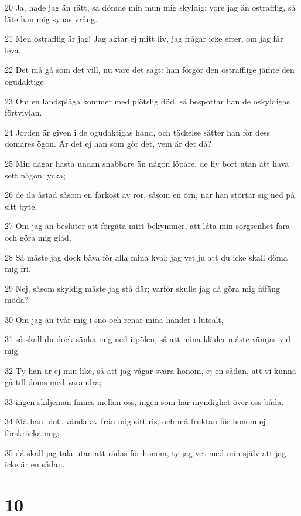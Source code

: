 \par 20 Ja, hade jag än rätt, så dömde min mun mig skyldig; vore jag än ostrafflig, så läte han mig synas vrång.
\par 21 Men ostrafflig är jag! Jag aktar ej mitt liv, jag frågar icke efter, om jag får leva.
\par 22 Det må gå som det vill, nu vare det sagt: han förgör den ostrafflige jämte den ogudaktige.
\par 23 Om en landsplåga kommer med plötslig död, så bespottar han de oskyldigas förtvivlan.
\par 24 Jorden är given i de ogudaktigas hand, och täckelse sätter han för dess domares ögon. Är det ej han som gör det, vem är det då?
\par 25 Min dagar hasta undan snabbare än någon löpare, de fly bort utan att hava sett någon lycka;
\par 26 de ila åstad såsom en farkost av rör, såsom en örn, när han störtar sig ned på sitt byte.
\par 27 Om jag än besluter att förgäta mitt bekymmer, att låta min sorgsenhet fara och göra mig glad,
\par 28 Så måste jag dock bäva för alla mina kval; jag vet ju att du icke skall döma mig fri.
\par 29 Nej, såsom skyldig måste jag stå där; varför skulle jag då göra mig fåfäng möda?
\par 30 Om jag än tvår mig i snö och renar mina händer i lutsalt,
\par 31 så skall du dock sänka mig ned i pölen, så att mina kläder måste vämjas vid mig.
\par 32 Ty han är ej min like, så att jag vågar svara honom, ej en sådan, att vi kunna gå till doms med varandra;
\par 33 ingen skiljeman finnes mellan oss, ingen som har myndighet över oss båda.
\par 34 Må han blott vända av från mig sitt ris, och må fruktan för honom ej förskräcka mig;
\par 35 då skall jag tala utan att rädas för honom, ty jag vet med min själv att jag icke är en sådan.

\chapter{10}

